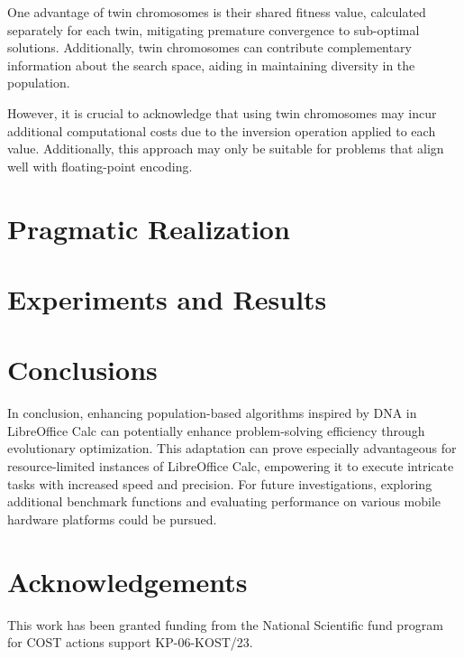 \documentclass[runningheads]{llncs}
\begin{document}
One advantage of twin chromosomes is their shared fitness value, calculated separately for each twin, mitigating premature convergence to sub-optimal solutions. Additionally, twin chromosomes can contribute complementary information about the search space, aiding in maintaining diversity in the population.

However, it is crucial to acknowledge that using twin chromosomes may incur additional computational costs due to the inversion operation applied to each value. Additionally, this approach may only be suitable for problems that align well with floating-point encoding.

\section{Pragmatic Realization}

\section{Experiments and Results}

\section{Conclusions}

In conclusion, enhancing population-based algorithms inspired by DNA in LibreOffice Calc can potentially enhance problem-solving efficiency through evolutionary optimization. This adaptation can prove especially advantageous for resource-limited instances of LibreOffice Calc, empowering it to execute intricate tasks with increased speed and precision. For future investigations, exploring additional benchmark functions and evaluating performance on various mobile hardware platforms could be pursued.

\section*{Acknowledgements} This work has been granted funding from the National Scientific fund program for COST actions support KP-06-KOST/23.
\end{document}
